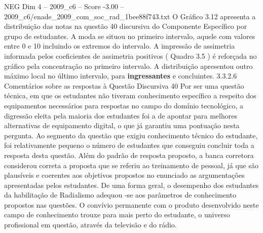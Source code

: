 \begin{textsample}{NEG Dim 4 – 2009\_c6 – Score -3.00 – 2009\_c6/enade\_2009\_com\_soc\_rad\_1bee88f743.txt}
O Gráfico 3.12 apresenta a distribuição das notas na questão 40 discursiva do Componente Específico por grupo de estudantes.
A moda se situou no primeiro intervalo, aquele com valores entre 0 e 10 incluindo os extremos do intervalo.
A impressão de assimetria informada pelos coeficientes de assimetria positivos ( Quadro 3.5 ) é reforçada no gráfico pela concentração no primeiro intervalo.
A distribuição apresentou outro máximo local no último intervalo, para \textbf{ingressantes} e concluintes. 3.3.2.6 Comentários sobre as respostas à Questão Discursiva 40 Por ser uma questão técnica, em que os estudantes não tiveram conhecimento específico a respeito dos equipamentos necessários para respostas no campo do domínio tecnológico, a digressão eleita pela maioria dos estudantes foi a de apontar para melhores alternativas de equipamento digital, o que já garantiu uma pontuação nesta pergunta.
Ao segmento da questão que exigiu conhecimento técnico do estudante, foi relativamente pequeno o número de estudantes que conseguiu concluir toda a resposta desta questão.
Além do padrão de resposta proposto, a banca corretora considerou correta a proposta que se referiu ao treinamento de pessoal, já que são plausíveis e coerentes aos objetivos propostos no enunciado as argumentações apresentadas pelos estudantes.
De uma forma geral, o desempenho dos estudantes da habilitação de Radialismo adequou -se aos parâmetros de conhecimento propostos nas questões.
O convívio permanente com o produto desenvolvido neste campo de conhecimento trouxe para mais perto do estudante, o universo profissional em questão, através da televisão e do rádio.

\end{textsample}
